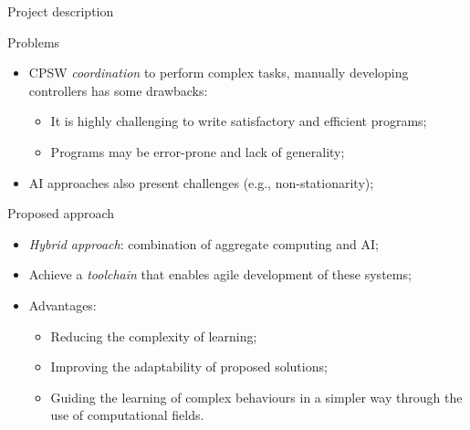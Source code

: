 \documentclass[presentation]{beamer}\mode<presentation>{\usetheme{AMSBolognaFC}}
\begin{document}
\begin{frame}[c]{Project description}

\begin{block}{Problems}
	\begin{itemize}
		\item CPSW \emph{coordination} to perform complex tasks, manually developing controllers 
			has some drawbacks:
		\begin{itemize}
			\item It is highly challenging to write satisfactory and efficient programs;
			\item Programs may be error-prone and lack of generality;
		\end{itemize}
		\item AI approaches also present challenges 
			(e.g., non-stationarity);
	\end{itemize}
\end{block}
	
\begin{alertblock}{Proposed approach}
	\begin{itemize}
		\item \emph{Hybrid approach}: combination of aggregate computing and AI;
		\item Achieve a \emph{toolchain} that enables agile development of these systems;
		\item Advantages:
		\begin{itemize}
			\item Reducing the complexity of learning;
			\item Improving the adaptability of proposed solutions;
			\item Guiding the learning of complex behaviours in a simpler way through the use of 
				computational fields.
		\end{itemize}
	\end{itemize}
\end{alertblock}

\end{frame}
\end{document}
